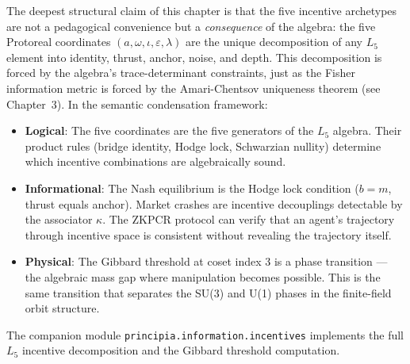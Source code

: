 The deepest structural claim of this chapter is that the five incentive archetypes are not a pedagogical convenience but a \emph{consequence} of the algebra: the five Protoreal coordinates $(a, \omega, \iota, \varepsilon, \lambda)$ are the unique decomposition of any $L_5$ element into identity, thrust, anchor, noise, and depth. This decomposition is forced by the algebra's trace-determinant constraints, just as the Fisher information metric is forced by the Amari-Chentsov uniqueness theorem (see Chapter~3). In the semantic condensation framework:

\begin{itemize}[noitemsep]
    \item \textbf{Logical}: The five coordinates are the five generators of the $L_5$ algebra. Their product rules (bridge identity, Hodge lock, Schwarzian nullity) determine which incentive combinations are algebraically sound.
    \item \textbf{Informational}: The Nash equilibrium is the Hodge lock condition ($b = m$, thrust equals anchor). Market crashes are incentive decouplings detectable by the associator $\kappa$. The ZKPCR protocol can verify that an agent's trajectory through incentive space is consistent without revealing the trajectory itself.
    \item \textbf{Physical}: The Gibbard threshold at coset index 3 is a phase transition --- the algebraic mass gap where manipulation becomes possible. This is the same transition that separates the SU(3) and U(1) phases in the finite-field orbit structure.
\end{itemize}

The companion module \texttt{principia.information.incentives} implements the full $L_5$ incentive decomposition and the Gibbard threshold computation.
